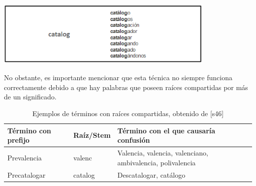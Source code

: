 \begin{enumerate}
\begin{center}
    \includegraphics[width=0.8\textwidth]{Images/Cap 2/Stemming.png}
\end{center}
No obstante, es importante mencionar que esta técnica no siempre funciona correctamente debido a que hay palabras que poseen raíces compartidas por más de un significado. 
\begin{table}[H]
    \centering
    \begin{tabular}{|p{4cm}|p{3cm}|p{5cm}|}
        \hline
        \textbf{Término con prefijo} & \textbf{Raíz/Stem} & \textbf{Término con el que causaría confusión} \\
        \hline
        Prevalencia & valenc & Valencia, valencia, valenciano, ambivalencia, polivalencia \\
        \hline
        Precatalogar & catalog & Descatalogar, catálogo \\
        \hline
    \end{tabular}
    \caption{Ejemplos de términos con raíces compartidas, obtenido de [s46]}
    \label{tabla:confusion}
\end{table}

\end{enumerate}

